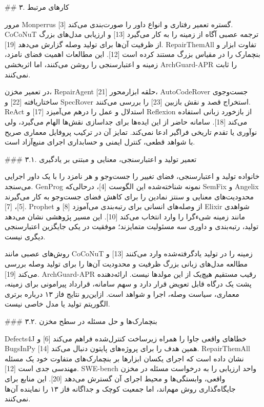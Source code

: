 \documentclass[11pt,a4paper]{article}
\begin{document}
\#\# ۳. کارهای مرتبط

مرور Monperrus گستره تعمیر رفتاری و انواع داور را صورت‌بندی می‌کند [3]. CoCoNuT ترجمه عصبی آگاه از
زمینه را به کار می‌گیرد [13] و ارزیابی مدل‌های بزرگ از ظرفیت آن‌ها برای تولید وصله گزارش می‌دهد [19].
RepairThemAll تفاوت ابزار و بنچمارک را در مقیاس بزرگ مستند کرده است [12]. این مطالعات اهمیت فضای
نامزد، زمینه و اعتبارسنجی را روشن می‌کنند، اما اثربخشی ArchGuard-APR را ثابت نمی‌کنند.

در تعمیر مخزن، RepairAgent حلقه ابزارمحور [21]، AutoCodeRover جست‌وجوی ساختاریافته [22] و SpecRover
استخراج قصد و نقش بازبین [23] را بررسی می‌کنند. ReAct استدلال و عمل را درهم می‌آمیزد [17] و Reflexion
از بازخورد زبانی استفاده می‌کند [18]. سامانه حاضر از این ایده‌ها برای جداسازی نقش‌ها الهام می‌گیرد،
ولی نوآوری یا تقدم تاریخی فراگیر ادعا نمی‌کند. تمایز آن در ترکیب پروفایل معماری صریح با شواهد قطعی،
کنترل ایمنی و حسابداری اجرای منبع‌آزاد است.

\#\#\# ۳.۱. تعمیر تولید و اعتبارسنجی، معنایی و مبتنی بر یادگیری

خانواده تولید و اعتبارسنجی، فضای تغییر را جست‌وجو و هر نامزد را با یک داور اجرایی می‌سنجد. GenProg
نمونه شناخته‌شده این الگوست [4]، درحالی‌که SemFix و Angelix محدودیت‌های معنایی و سنتز نمادین را برای
کاهش فضای جست‌وجو به کار می‌گیرند [5]، [7]. Prophet از وصله‌های انسانی برای رتبه‌بندی می‌آموزد [8]
و Elixir شواهدی مانند زمینه شیءگرا را وارد انتخاب می‌کند [10]. این مسیر پژوهشی نشان می‌دهد تولید،
رتبه‌بندی و داوری سه مسئولیت متمایزند؛ موفقیت در یکی جایگزین اعتبارسنجی دیگری نیست.

روش‌های عصبی مانند CoCoNuT زمینه را در تولید یادگرفته‌شده وارد می‌کنند [13] و مطالعه مدل‌های زبانی
بزرگ ظرفیت و محدودیت آن‌ها را برای تولید وصله بررسی می‌کند [19]. ArchGuard-APR رقیب مستقیم هیچ‌یک
از این مولدها نیست. ارائه‌دهنده پشت یک درگاه قابل تعویض قرار دارد و سهم سامانه، قرارداد پیرامونی برای
زمینه، معماری، سیاست وصله، اجرا و شواهد است. ازاین‌رو نتایج فاز ۱۳ درباره برتری الگوریتم تولید یا مدل
خاصی نیست.

\#\#\# ۳.۲. بنچمارک‌ها و حل مسئله در سطح مخزن

Defects4J خطاهای واقعی جاوا را همراه زیرساخت کنترل‌شده فراهم می‌کند [6] و BugsInPy همین هدف را برای
پروژه‌های پایتون دنبال می‌کند [14]. RepairThemAll نشان داده است که اجرای یکسان ابزارها بر بنچمارک‌های
متفاوت خود یک مسئله مهندسی جدی است [12]. SWE-bench واحد ارزیابی را به درخواست مسئله در مخزن واقعی،
وابستگی‌ها و محیط اجرای آن گسترش می‌دهد [20]. این منابع برای جایگاه‌گذاری روش مهم‌اند، اما جمعیت کوچک
و جداگانه فاز ۱۳ را نماینده آن‌ها نمی‌کنند.
\end{document}
